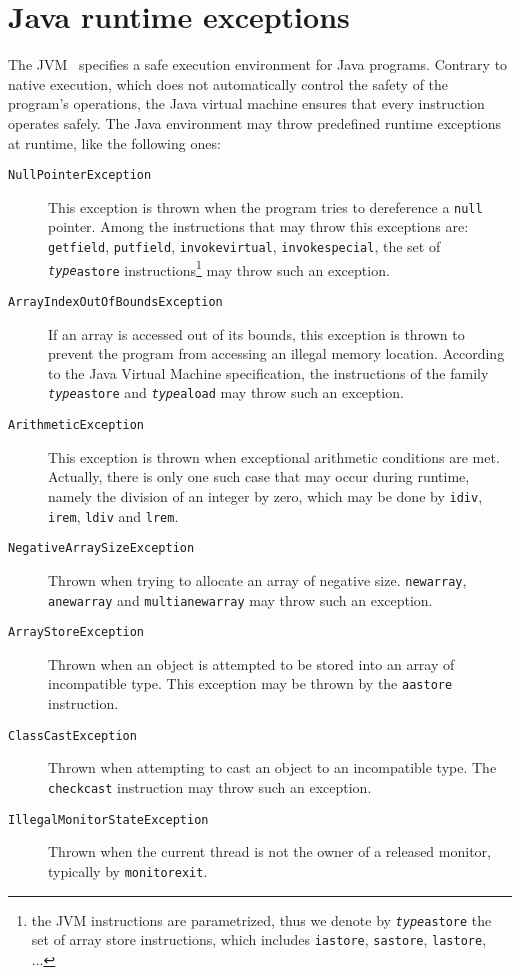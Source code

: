 

\section{Java runtime exceptions}
\label{sec:runtimeexceptions}
The JVM~\cite{Lindholm2000} specifies a safe execution environment for Java programs. Contrary to native execution, which does not automatically control the safety of the program's operations, the Java virtual machine ensures that every instruction operates safely. The Java environment may throw predefined runtime exceptions at runtime, like the following ones:

\begin{description}
\item[\texttt{NullPointerException}]
This exception is thrown when the program tries to dereference a \texttt{null} pointer. Among the instructions
that may throw this exceptions are: \texttt{getfield}, \texttt{putfield}, \texttt{invokevirtual}, \texttt{invokespecial}, the set of  \texttt{\emph{type}astore} instructions\footnote{the JVM instructions are parametrized, thus we denote by \texttt{\emph{type}astore} the set of array store instructions, which includes \texttt{iastore}, \texttt{sastore}, \texttt{lastore}, ...} may throw such an exception.
\item[\texttt{ArrayIndexOutOfBoundsException}] If an array is accessed out of its bounds, this exception is thrown to prevent the program from accessing an illegal memory location. According to the Java Virtual Machine specification, the instructions of the family \texttt{\emph{type}astore} and \texttt{\emph{type}aload} may throw such an exception.
\item[\texttt{ArithmeticException}] This exception is thrown when exceptional arithmetic conditions are met. Actually, there is only one such case that may occur during runtime, namely the division of an integer by zero, which may be done by \texttt{idiv}, \texttt{irem}, \texttt{ldiv} and \texttt{lrem}.
\item[\texttt{NegativeArraySizeException}] Thrown when trying to allocate an array of negative size. \texttt{newarray}, \texttt{anewarray} and \texttt{multianewarray} may throw such an exception.
\item[\texttt{ArrayStoreException}] Thrown when an object is attempted to be stored into an array of incompatible type. This exception may be thrown by the \texttt{aastore} instruction.
\item[\texttt{ClassCastException}] Thrown when attempting to cast an object to an incompatible type. The \texttt{checkcast} instruction may throw such an exception.
\item[\texttt{IllegalMonitorStateException}] Thrown when the current thread is not the owner of a released monitor, typically by \texttt{monitorexit}.

\end{description}

